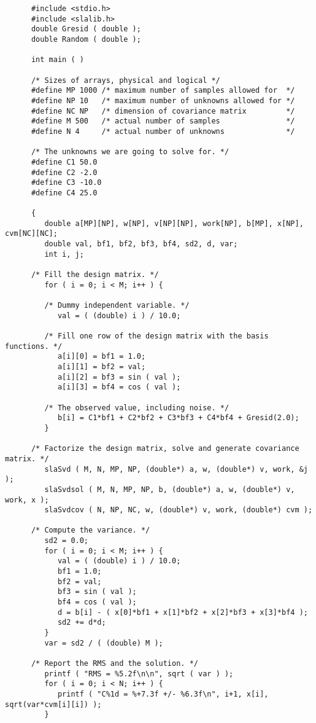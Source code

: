 \documentclass[11pt,fleqn,twoside]{article}
\renewcommand{\_}{{\tt\char'137}}     %
\begin{document}
\begin{verbatim}
      #include <stdio.h>
      #include <slalib.h>
      double Gresid ( double );
      double Random ( double );

      int main ( )

      /* Sizes of arrays, physical and logical */
      #define MP 1000 /* maximum number of samples allowed for  */
      #define NP 10   /* maximum number of unknowns allowed for */
      #define NC NP   /* dimension of covariance matrix         */
      #define M 500   /* actual number of samples               */
      #define N 4     /* actual number of unknowns              */

      /* The unknowns we are going to solve for. */
      #define C1 50.0
      #define C2 -2.0
      #define C3 -10.0
      #define C4 25.0

      {
         double a[MP][NP], w[NP], v[NP][NP], work[NP], b[MP], x[NP], cvm[NC][NC];
         double val, bf1, bf2, bf3, bf4, sd2, d, var;
         int i, j;

      /* Fill the design matrix. */
         for ( i = 0; i < M; i++ ) {

         /* Dummy independent variable. */
            val = ( (double) i ) / 10.0;

         /* Fill one row of the design matrix with the basis functions. */
            a[i][0] = bf1 = 1.0;
            a[i][1] = bf2 = val;
            a[i][2] = bf3 = sin ( val );
            a[i][3] = bf4 = cos ( val );

         /* The observed value, including noise. */
            b[i] = C1*bf1 + C2*bf2 + C3*bf3 + C4*bf4 + Gresid(2.0);
         }

      /* Factorize the design matrix, solve and generate covariance matrix. */
         slaSvd ( M, N, MP, NP, (double*) a, w, (double*) v, work, &j );
         slaSvdsol ( M, N, MP, NP, b, (double*) a, w, (double*) v, work, x );
         slaSvdcov ( N, NP, NC, w, (double*) v, work, (double*) cvm );

      /* Compute the variance. */
         sd2 = 0.0;
         for ( i = 0; i < M; i++ ) {
            val = ( (double) i ) / 10.0;
            bf1 = 1.0;
            bf2 = val;
            bf3 = sin ( val );
            bf4 = cos ( val );
            d = b[i] - ( x[0]*bf1 + x[1]*bf2 + x[2]*bf3 + x[3]*bf4 );
            sd2 += d*d;
         }
         var = sd2 / ( (double) M );

      /* Report the RMS and the solution. */
         printf ( "RMS = %5.2f\n\n", sqrt ( var ) );
         for ( i = 0; i < N; i++ ) {
            printf ( "C%1d = %+7.3f +/- %6.3f\n", i+1, x[i], sqrt(var*cvm[i][i]) );
         }


\end{verbatim}
\end{document}
